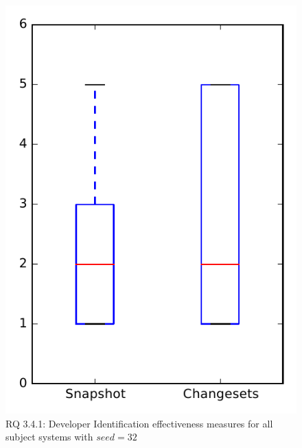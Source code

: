 
\begin{figure}
\centering
\includegraphics[height=0.4\textheight]{figures/dit_seed/rq1_overview_32}
\caption{RQ 3.4.1: Developer Identification effectiveness measures for all subject systems with $seed=32$}
\label{fig:dit_seed:rq1:overview}
\end{figure}
